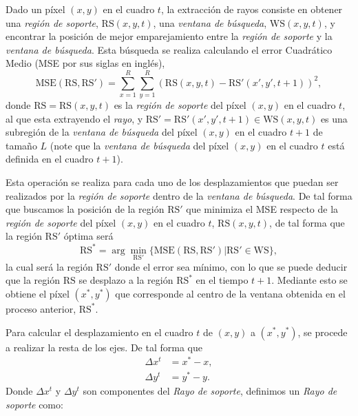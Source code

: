 	Dado un píxel $(x,y)$ en el cuadro $t$, la extracción de rayos consiste en obtener una \textit{región de soporte}, $\text{RS}(x,y,t)$, una \textit{ventana de búsqueda}, $\text{WS}(x,y,t)$, y encontrar la posición de mejor emparejamiento entre la \textit{región de soporte} y la \textit{ventana de búsqueda}. Esta búsqueda se realiza calculando el error Cuadrático Medio (MSE por sus siglas en inglés), \begin{equation}\label{algoritmo:eq:mse}	
			\text{MSE}(\text{RS}, \text{RS}') = \sum_{x=1}^{R} \sum_{y=1}^{R} (\text{RS}(x,y,t) - \text{RS}'(x',y', t+1))^2,
		\end{equation} 
	donde $\text{RS} = \text{RS}(x,y,t)$ es la \textit{región de soporte} del píxel $(x,y)$ en el cuadro $t$, al que esta extrayendo el \textit{rayo}, y $\text{RS}' = \text{RS}'(x',y',t+1) \in \text{WS}(x,y,t)$ es una subregión de la \textit{ventana de búsqueda} del píxel $(x,y)$ en el cuadro $t+1$ de tamaño $L$ (note que la \textit{ventana de búsqueda} del píxel $(x,y)$ en el cuadro $t$ está definida en el cuadro $t+1$).
		
	Esta operación se realiza para cada uno de los desplazamientos que puedan ser realizados por la \textit{región de soporte} dentro de la \textit{ventana de búsqueda}. De tal forma que buscamos la posición de la región $\text{RS}'$ que minimiza el MSE respecto de la \textit{región de soporte} del píxel $(x,y)$ en el cuadro $t$, $\text{RS}(x,y,t)$, de tal forma que la región $\text{RS}'$ óptima será
	\begin{equation}
		\text{RS}^* = \arg \min_{\text{RS}'}\{\text{MSE}(\text{RS},\text{RS}') | \text{RS}' \in \text{WS} \},
	\end{equation}		
	 la cual será la región $\text{RS}'$ donde el error sea mínimo, con lo que se puede deducir que la región $\text{RS}$ se desplazo a la región $\text{RS}^*$ en el tiempo $t+1$. Mediante esto se obtiene el píxel $(x^*,y^*)$ que corresponde al centro de la ventana obtenida en el proceso anterior, $\text{RS}^*$.
	
	Para calcular el desplazamiento en el cuadro $t$ de $(x,y)$ a $(x^*,y^*)$, se procede a realizar la resta de los ejes. De tal forma que
	\begin{align}
		\Delta x^{t} &= x^*-x,\\ 
		\Delta y^{t} &= y^*-y.
	\end{align}
		Donde $ \Delta x^t$ y $ \Delta y^t$ son componentes del \textit{Rayo de soporte}, definimos un \textit{Rayo de soporte} como:
	
